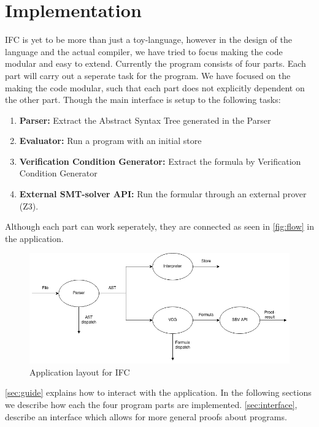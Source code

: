 \section{Implementation}\label{sec:implementation}
IFC is yet to be more than just a toy-language, however in the design of the language and the actual compiler, we have tried to focus making the code modular and easy to extend.
Currently the program consists of four parts. Each part will carry out a seperate task for the program. We have focused on the making the code modular, such that each part does not explicitly dependent on the other part. Though the main interface is setup to the following tasks:
\begin{enumerate}
  \item \textbf{Parser:} Extract the Abstract Syntax Tree generated in the Parser
  \item \textbf{Evaluator:} Run a program with an initial store
  \item \textbf{Verification Condition Generator:} Extract the formula by Verification Condition Generator
  \item \textbf{External SMT-solver API:} Run the formular through an external prover (Z3).
\end{enumerate}
Although each part can work seperately, they are connected as seen in \autoref{fig:flow} in the application.

\begin{figure}[h]
  \includegraphics[width=\linewidth]{Implementation/IFCflow.png}
  \caption{Application layout for IFC}
  \label{fig:flow}
\end{figure}

\autoref{sec:guide} explains how to interact with the application. In the following sections we describe how each the four program parts are implemented. \autoref{sec:interface}, describe an interface which allows for more general proofs about programs.










